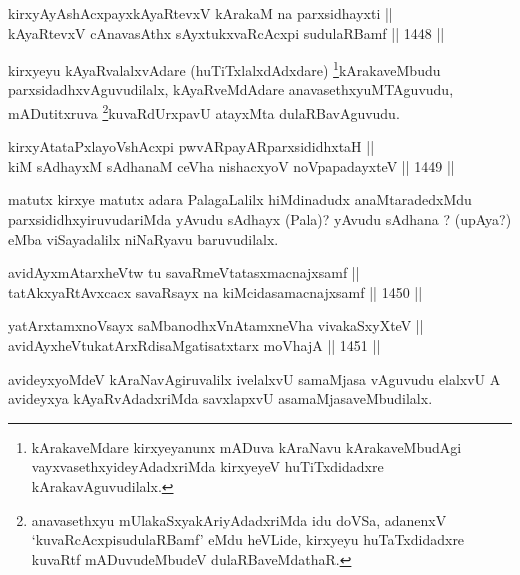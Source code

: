 
\begin{shl}
kirxyAyAshAcxpayxkAyaRtevxV kArakaM na parxsidhayxti || \\
kAyaRtevxV cAnavasAthx sAyxtukxvaRcAcxpi sudulaRBamf \hfill || 1448 ||  
\end{shl}

\begin{artha}
kirxyeyu kAyaRvalalxvAdare (huTiTxlalxdAdxdare) \footnote{kArakaveMdare kirxyeyanunx mADuva kAraNavu kArakaveMbudAgi vayxvasethxyideyAdadxriMda kirxyeyeV huTiTxdidadxre kArakavAguvudilalx.}kArakaveMbudu parxsidadhxvAguvudilalx, kAyaRveMdAdare anavasethxyuMTAguvudu, mADutitxruva \footnote{anavasethxyu mUlakaSxyakAriyAdadxriMda idu doVSa, adanenxV `kuvaRcAcxpisudulaRBamf' eMdu heVLide, kirxyeyu huTaTxdidadxre kuvaRtf mADuvudeMbudeV dulaRBaveMdathaR.}kuvaRdUrxpavU atayxMta dulaRBavAguvudu.
\end{artha}

\begin{shl}
kirxyAtataPxlayoVshAcxpi pwvARpayARparxsididhxtaH ||  \\
kiM sAdhayxM sAdhanaM ceVha nishacxyoV noVpapadayxteV \hfill || 1449 ||  
\end{shl}

\begin{artha}
matutx kirxye matutx adara PalagaLalilx hiMdinadudx anaMtaradedxMdu parxsididhxyiruvudariMda yAvudu sAdhayx (Pala)? yAvudu sAdhana ? (upAya?) eMba viSayadalilx niNaRyavu baruvudilalx.
\end{artha}


\begin{shl}
avidAyxmAtarxheVtw tu savaRmeVtatasxmacnajxsamf || \\
tatAkxyaRtAvxcacx savaRsayx na kiMcidasamacnajxsamf \hfill || 1450 ||  
\end{shl}
				
\begin{shl}
yatArx\s \s tamxnoV\s sayx saMbanodhxV\s nAtamxneVha vivakaSxyXteV || \\
avidAyxheVtukatArxRdisaMgatisatxtarx moVhajA \hfill || 1451 ||  
\end{shl}

\begin{artha}
avideyxyoMdeV kAraNavAgiruvalilx ivelalxvU samaMjasa vAguvudu elalxvU A avideyxya kAyaRvAdadxriMda savxlapxvU asamaMjasaveMbudilalx.
\end{artha}

